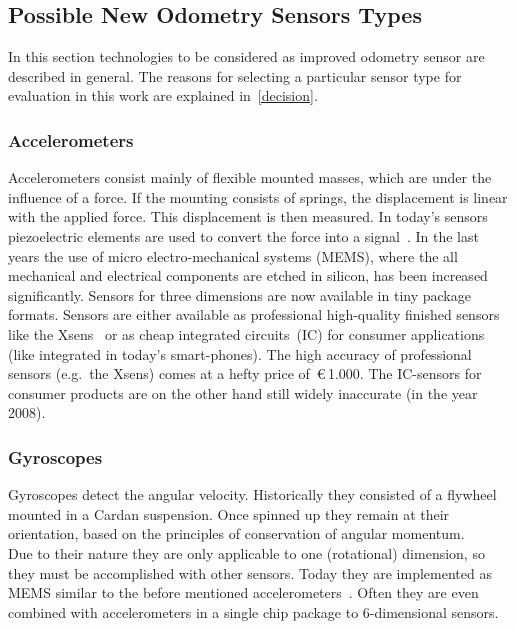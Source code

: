 \documentclass[12pt,a4paper]{article}
\begin{document}
\subsection{Possible New Odometry Sensors Types}
\label{ssec:ntypes}

In this section technologies to be considered as improved odometry sensor are described in general.
The reasons for selecting a particular sensor type for evaluation in this work are explained in~\autoref{decision}.


\subsubsection{Accelerometers}

Accelerometers consist mainly of flexible mounted masses, which are under the influence of a force.
If the mounting consists of springs, the displacement is linear with the applied force.
This displacement is then measured.
In today's sensors piezoelectric elements are used to convert the force into a signal~\cite{emt}.
In the last years the use of micro electro-mechanical systems (MEMS), where the all mechanical and electrical components are etched in silicon, has been increased significantly.
Sensors for three dimensions are now available in tiny package formats.
Sensors are either available as professional high-quality finished sensors like the Xsens~\cite{xsens} or as cheap integrated circuits~(IC) for consumer applications (like integrated in today's smart-phones).
The high accuracy of professional sensors (e.g.\ the Xsens) comes at a hefty price of~\euro\,1.000.
The IC-sensors for consumer products are on the other hand still widely inaccurate (in the year 2008).


\subsubsection{Gyroscopes}

Gyroscopes detect the angular velocity.
Historically they consisted of a flywheel mounted in a Cardan suspension.
Once spinned up they remain at their orientation, based on the principles of conservation of angular momentum.\\
Due to their nature they are only applicable to one (rotational) dimension, so they must be accomplished with other sensors.
Today they are implemented as MEMS similar to  the before mentioned accelerometers~\cite{pmt}.
Often they are even combined with accelerometers in a single chip package to 6-dimensional sensors.
\end{document}
